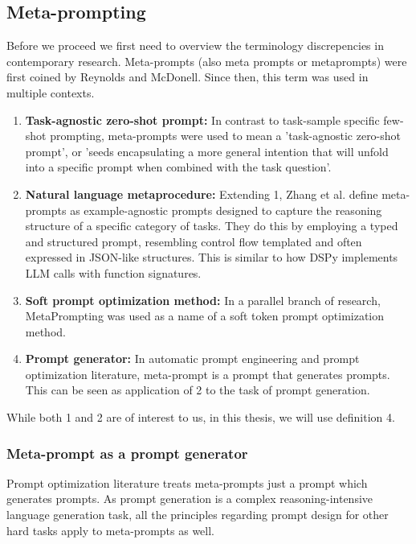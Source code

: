 \subsection{Meta-prompting}
Before we proceed we first need to overview the terminology discrepencies in contemporary research. 
Meta-prompts (also meta prompts or metaprompts) were first coined by Reynolds and McDonell\cite{reynolds2021promptprogramminglargelanguage}. 
Since then, this term was used in multiple contexts.
\begin{enumerate}
    \item \textbf{Task-agnostic zero-shot prompt:} In contrast to task-sample specific few-shot prompting, 
    meta-prompts were used to mean a 'task-agnostic zero-shot prompt', or 'seeds encapsulating a more general intention that will unfold into
    a specific prompt when combined with the task question'\cite{reynolds2021promptprogramminglargelanguage}. 
    \item \textbf{Natural language metaprocedure:} Extending 1, Zhang et al.\cite{zhang2025metapromptingaisystems} define meta-prompts as example-agnostic prompts
    designed to capture the reasoning structure of a specific category of tasks. They do this by employing a typed and structured prompt, 
    resembling control flow templated and often expressed in JSON-like structures.
    This is similar to how DSPy\cite{khattab2023dspycompilingdeclarativelanguage} implements LLM calls with function signatures.
    \item \textbf{Soft prompt optimization method:} In a parallel branch of research, MetaPrompting\cite{hou2023metapromptinglearninglearnbetter} 
    was used as a name of a soft token prompt optimization method.
    \item \textbf{Prompt generator:} In automatic prompt engineering and prompt optimization literature, meta-prompt is a prompt that generates prompts\cite{dewynter2024metaprompting}.
    This can be seen as application of 2 to the task of prompt generation\cite{zhang2025metapromptingaisystems}.
\end{enumerate}

While both 1 and 2 are of interest to us, in this thesis, we will use definition 4. 

\subsubsection{Meta-prompt as a prompt generator}
Prompt optimization literature\cite{ramnath2025systematicsurveyautomaticprompt} treats meta-prompts just a prompt which generates prompts.
As prompt generation is a complex reasoning-intensive language generation task\cite{ye2024promptengineeringpromptengineer}, 
all the principles regarding prompt design for other hard tasks apply to meta-prompts as well.

